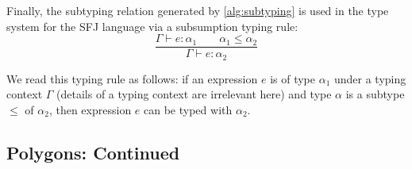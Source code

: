 \documentclass[runningheads]{llncs}
\begin{document}

Finally, the subtyping relation generated by \autoref{alg:subtyping} is used in the type system for the SFJ language via a subsumption typing rule:
 $$
 \frac{\Gamma\vdash e:\alpha_1 \qquad \alpha_1 \leq \alpha_2}{\Gamma \vdash e:\alpha_2}
 $$

We read this typing rule as follows:
if an expression $e$ is of type $\alpha_1$ under a typing context $\Gamma$ (details of a typing context are irrelevant here) and type $\alpha$ is a subtype $\leq$ of $\alpha_2$, then expression $e$ can be typed with $\alpha_2$.


\subsection{Polygons: Continued}
\end{document}
